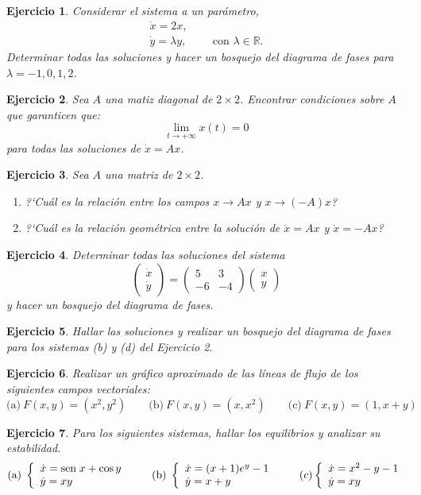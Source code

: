 \documentclass[11pt,a4paper,pdftex]{amsart}
\newtheorem{ej}{Ejercicio}%
\numberwithin{equation}{section}%
\newcommand{\bej}[1]{\begin{ej}\rm{#1}}
\newcommand{\eej}{\end{ej}\vspace{-0.2cm}}
\newcommand{\ba}{\begin{array}}
\newcommand{\ea}{\end{array}}
\newcommand{\0}{\mathbb O}
\newcommand{\8}{\infty}
\newcommand{\sen}[1]{\mbox{sen}\;{#1}}
\begin{document}
\bej Considerar el sistema a un par\'ametro,
$$\begin{aligned}
\dot{x}=2x, &\\
\dot{y}=\lambda y, &\ \ \ \ \ \mbox{ con } \lambda \in \mathbb{R}.
\end{aligned}$$
Determinar todas las soluciones y hacer un bosquejo del diagrama
de fases para $\lambda=-1,0,1,2$.
\eej

\bej Sea $A$ una matiz diagonal de $2\times 2$. Encontrar condiciones
sobre $A$ que garanticen que:
$$\lim_{t\to +\infty} x(t)=0$$ para todas las soluciones de $\dot{x}=Ax$.
\eej

\bej Sea $A$ una matriz de $2\times 2$.
\begin{enumerate}
\item[(a)] ?`Cu\'al es la relaci\'on entre los campos $x\rightarrow Ax$
y $x\rightarrow (-A)x$?
\item[(b)] ?`Cu\'al es la relaci\'on geom\'etrica entre la soluci\'on
de $\dot{x}=Ax$ y $\dot{x}=-Ax$?
\end{enumerate}
\eej

\bej Determinar todas las soluciones del sistema
$$\left(\begin{aligned}\dot{x}\\ \dot{y}\end{aligned}\right)=
\left(\begin{array}{rr}5 & 3\\-6 & -4\end{array}\right)
\left(\begin{aligned}x\\ y\end{aligned}\right)$$ y hacer un
bosquejo del diagrama de fases.
\eej

\bej Hallar las soluciones y realizar un bosquejo del diagrama de fases para los
sistemas (b) y (d) del Ejercicio 2.
\eej

\bej Realizar un {gráfico aproximado} de las líneas de flujo de los siguientes campos vectoriales:
\[%
\text{(a)} \ F(x,y)=(x^{2},y^{2}) \qquad \text{(b)} \ F(x,y)=(x,x^{2}) \qquad
 \text{(c)} \ F\left(  x,y\right)
=\left(  1,x+y\right)
\]
\eej

\bej Para los siguientes  sistemas, hallar los equilibrios y analizar su estabilidad.
$$\text{(a)}\; \left\{\ba{l}\dot{x}=\sen x+\cos y\\ \dot{y}=xy \ea \right. \qquad
\text{(b)}\; \left\{\ba{l}\dot{x}=(x+1)e^y-1\\ \dot{y}=x+ y \ea \right.
\qquad \text(c)\left\{\ba{l}\dot x=x^2-y-1\\ \dot y = xy\ea\right.$$
\eej
\end{document}

